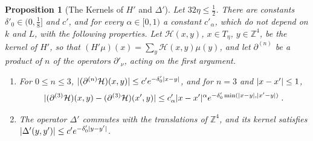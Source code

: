 \documentclass[11pt]{preprint}
\DeclarePairedDelimiter{\abs}{\lvert}{\rvert}
\numberwithin{equation}{section}
\newtheorem{proposition}[theorem]{Proposition}
\theoremstyle{definition}
\theoremstyle{remark}
\theoremstyle{plain}
\begin{document}
\begin{proposition}[The Kernels of $H'$ and $\Delta'$]\label{prop:gauge-kernel}
Let $32\eta \leq \frac12$. There are constants $\delta'_0 \in (0, \frac18]$ and $c'$, and for every $\alpha \in [0, 1)$ a constant $c'_\alpha$, which do not depend on $k$ and $L$, with the following properties. Let $\mathcal H(x, y)$, $x \in T_\eta$, $y \in \mathbb Z^4$, be the kernel of $H'$, so that $(H'\mu)(x) = \sum_y\mathcal H(x, y)\mu(y)$, and let $\partial^{(n)}$ be a product of $n$ of the operators $\partial'_\nu$, acting on the first argument.
\begin{enumerate}[label=(\roman*)]
\item For $0 \leq n \leq 3$, $\abs{(\partial^{(n)}\mathcal H)(x, y)} \leq c'e^{-\delta'_0\abs{x - y}}$, and for $n = 3$ and $\abs{x - x'} \leq 1$,
\begin{equation}\label{eq:gauge-kernel-hoelder}
    \abs{(\partial^{(3)}\mathcal H)(x, y) - (\partial^{(3)}\mathcal H)(x', y)} \leq c'_\alpha\abs{x - x'}^\alpha e^{-\delta'_0\min(\abs{x - y}, \abs{x' - y})}\;.
\end{equation}
\item The operator $\Delta'$ commutes with the translations of $\mathbb Z^4$, and its kernel satisfies $\abs{\Delta'(y, y')} \leq c'e^{-\delta'_0\abs{y - y'}}$.
\end{enumerate}
\end{proposition}
\end{document}
